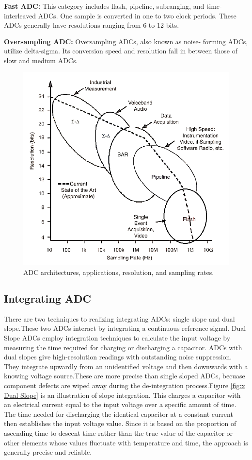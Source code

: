 \textbf{Fast ADC:} This category includes flash, pipeline, subranging, and time-interleaved ADCs. One sample is converted in one to two clock periods. These ADCs generally have resolutions ranging from 6 to 12 bits.\par

\textbf{Oversampling ADC:} Oversampling ADCs, also known as noise- forming ADCs, utilize delta-sigma. Its conversion speed and resolution fall in between those of slow and medium ADCs.\par
\begin{figure}[htbp]
\centering
\includegraphics[scale=0.6]{images/ADC Archi.PNG}
\caption{ADC architectures, applications, resolution, and sampling rates.}
\label{fig:x ADC architectures}
\end{figure}

\subsection{Integrating ADC}
There are two techniques to realizing integrating ADCs: single slope and dual slope.These two ADCs interact by integrating a continuous reference signal. Dual Slope ADCs employ integration techniques to calculate the input voltage by measuring the time required for charging or discharging a capacitor. ADCs with dual slopes give high-resolution readings with outstanding noise suppression. They integrate upwardly from an unidentified voltage and then downwards with a knowing voltage source.These are more precise than single sloped ADCs, becuase component defects are wiped away during the de-integration process.Figure \ref{fig:x Dual Slope} is an illustration of slope integration. This charges a capacitor with an electrical current equal to the input voltage over a specific amount of time. The time needed for discharging the identical capacitor at a constant current then establishes the input voltage value. Since it is based on the proportion of ascending time to descent time rather than the true value of the capacitor or other elements whose values fluctuate with temperature and time, the approach is generally precise and reliable.

